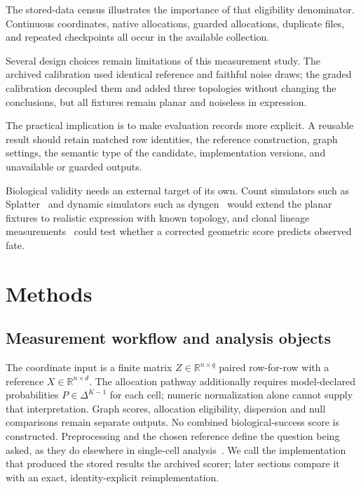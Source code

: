 \documentclass[11pt]{article}
\begin{document}
The stored-data census illustrates the importance of that eligibility denominator. Continuous coordinates, native allocations, guarded allocations, duplicate files, and repeated checkpoints all occur in the available collection.

Several design choices remain limitations of this measurement study. The archived calibration used identical reference and faithful noise draws; the graded calibration decoupled them and added three topologies without changing the conclusions, but all fixtures remain planar and noiseless in expression.

The practical implication is to make evaluation records more explicit. A reusable result should retain matched row identities, the reference construction, graph settings, the semantic type of the candidate, implementation versions, and unavailable or guarded outputs.

Biological validity needs an external target of its own. Count simulators such as Splatter~\cite{zappia2017splatter} and dynamic simulators such as dyngen~\cite{cannoodt2021dyngen} would extend the planar fixtures to realistic expression with known topology, and clonal lineage measurements~\cite{weinreb2020lineage} could test whether a corrected geometric score predicts observed fate.

\section{Methods}
\subsection{Measurement workflow and analysis objects}

The coordinate input is a finite matrix $Z\in\mathbb R^{n\times q}$ paired row-for-row with a reference $X\in\mathbb R^{n\times d}$. The allocation pathway additionally requires model-declared probabilities $P\in\Delta^{K-1}$ for each cell; numeric normalization alone cannot supply that interpretation. Graph scores, allocation eligibility, dispersion and null comparisons remain separate outputs. No combined biological-success score is constructed. Preprocessing and the chosen reference define the question being asked, as they do elsewhere in single-cell analysis~\cite{luecken2019practices}. We call the implementation that produced the stored results the archived scorer; later sections compare it with an exact, identity-explicit reimplementation.
\end{document}
